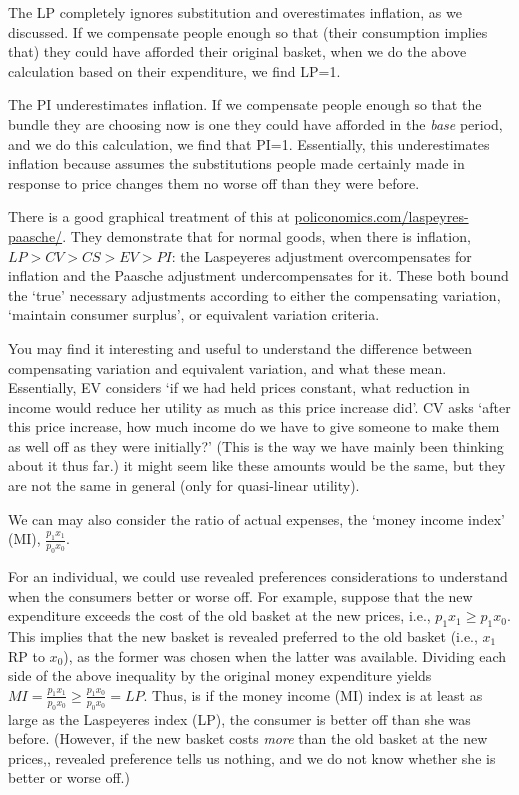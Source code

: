 \documentclass[]{article}
\begin{document}
The LP completely ignores substitution and overestimates inflation, as we discussed. If we compensate people enough so that (their consumption implies that) they could have afforded their original basket, when we do the above calculation based on their expenditure, we find LP=1.

The PI underestimates inflation. If we compensate people enough so that the bundle they are choosing now is one they could have afforded in the \emph{base} period, and we do this calculation, we find that PI=1. Essentially, this underestimates inflation because assumes the substitutions people made certainly made in response to price changes them no worse off than they were before.

There is a good graphical treatment of this at \url{policonomics.com/laspeyres-paasche/}. They demonstrate that for normal goods, when there is inflation, \(LP>CV>CS>EV>PI\): the Laspeyeres adjustment overcompensates for inflation and the Paasche adjustment undercompensates for it. These both bound the `true' necessary adjustments according to either the compensating variation, `maintain consumer surplus', or equivalent variation criteria.

You may find it interesting and useful to understand the difference between compensating variation and equivalent variation, and what these mean. Essentially, EV considers `if we had held prices constant, what reduction in income would reduce her utility as much as this price increase did'. CV asks `after this price increase, how much income do we have to give someone to make them as well off as they were initially?' (This is the way we have mainly been thinking about it thus far.) it might seem like these amounts would be the same, but they are not the same in general (only for quasi-linear utility).

\bigskip

We can may also consider the ratio of actual expenses, the `money income index' (MI), \(\frac{p_1 x_1}{p_0 x_0}\).

For an individual, we could use revealed preferences considerations to understand when the consumers better or worse off. For example, suppose that the new expenditure exceeds the cost of the old basket at the new prices, i.e., \(p_1 x_1 \geq p_1 x_0\). This implies that the new basket is revealed preferred to the old basket (i.e., \(x_1\) RP to \(x_0\)), as the former was chosen when the latter was available. Dividing each side of the above inequality by the original money expenditure yields \(MI=\frac{p_1 x_1}{p_0 x_0}\geq \frac{p_1 x_0}{p_0 x_0}=LP\). Thus, is if the money income (MI) index is at least as large as the Laspeyeres index (LP), the consumer is better off than she was before. (However, if the new basket costs \emph{more} than the old basket at the new prices,, revealed preference tells us nothing, and we do not know whether she is better or worse off.)
\end{document}
